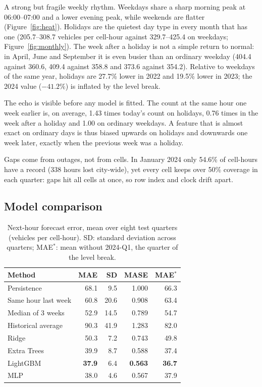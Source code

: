 \documentclass[sigconf]{acmart}
\begin{document}
A strong but fragile weekly rhythm. Weekdays share a sharp morning peak at 06:00--07:00 and a lower evening peak, while weekends are flatter (Figure~\ref{fig:heat}). Holidays are the quietest day type in every month that has one (205.7--308.7 vehicles per cell-hour against 329.7--425.4 on weekdays; Figure~\ref{fig:monthly}). The week after a holiday is not a simple return to normal: in April, June and September it is even busier than an ordinary weekday (404.4 against 360.6, 409.4 against 358.8 and 373.6 against 354.2). Relative to weekdays of the same year, holidays are 27.7\% lower in 2022 and 19.5\% lower in 2023; the 2024 value ($-41.2\%$) is inflated by the level break.

The echo is visible before any model is fitted. The count at the same hour one week earlier is, on average, 1.43 times today's count on holidays, 0.76 times in the week after a holiday and 1.00 on ordinary weekdays. A feature that is almost exact on ordinary days is thus biased upwards on holidays and downwards one week later, exactly when the previous week was a holiday.

Gaps come from outages, not from cells. In January 2024 only 54.6\% of cell-hours have a record (338 hours lost city-wide), yet every cell keeps over 50\% coverage in each quarter: gaps hit all cells at once, so row index and clock drift apart.

\subsection{Model comparison}
\begin{table}[t]
  \caption{Next-hour forecast error, mean over eight test quarters (vehicles per cell-hour). SD: standard deviation across quarters; MAE$^{*}$: mean without 2024-Q1, the quarter of the level break.}
  \label{tab:rq2}
  \small
  \setlength{\tabcolsep}{4pt}
  \begin{tabular}{lrrrr}
    \toprule
    Method & MAE & SD & MASE & MAE$^{*}$ \\
    \midrule
    Persistence         & 68.1 & 9.5  & 1.000 & 66.3 \\
    Same hour last week & 60.8 & 20.6 & 0.908 & 63.4 \\
    Median of 3 weeks   & 52.9 & 14.5 & 0.789 & 54.7 \\
    Historical average  & 90.3 & 41.9 & 1.283 & 82.0 \\
    \midrule
    Ridge               & 50.3 & 7.2  & 0.743 & 49.8 \\
    Extra Trees         & 39.9 & 8.7  & 0.588 & 37.4 \\
    LightGBM            & \textbf{37.9} & 6.4 & \textbf{0.563} & \textbf{36.7} \\
    MLP                 & 38.0 & 4.6  & 0.567 & 37.9 \\
    \bottomrule
  \end{tabular}
\end{table}
\end{document}
